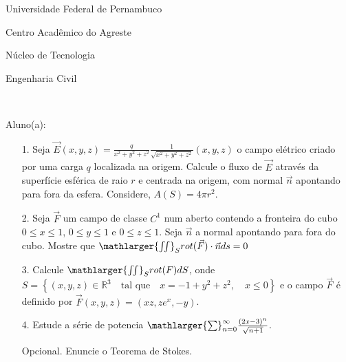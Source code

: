 \documentclass[oneside,a4paper,12pt]{article}
\newcommand{\universidade}{Universidade Federal de Pernambuco}
\newcommand{\centro}{Centro Acadêmico do Agreste}
\newcommand{\departamento}{Núcleo de Tecnologia}
\newcommand{\curso}{Engenharia Civil}
\begin{document}
	\pagestyle{empty}
	
	\begin{center}
	 	\vspace{0pt}
	 	
		\universidade
		\par
		\centro
		\par
		\departamento
		\par
		\curso
		\par
		\vspace{08pt}
		\\
	\end{center}
	
	
	\begin{flushleft}
		Aluno(a):
	\end{flushleft}
	
\begin{itemize}
\item[1.] Seja $\vec{E}(x,y,z)=\frac{q}{x^{2}+y^{2}+z^{2}}\frac{1}{\sqrt{x^{2}+y^{2}+z^{2}}}(x,y,z)$ o campo elétrico criado por uma carga $q$ localizada na origem. Calcule o fluxo de $\vec{E}$ através da superfície esférica de raio $r$ e centrada na origem, com normal $\vec{n}$ apontando para fora da esfera. Considere, $A(S)=4\pi r^{2}$.
\end{itemize}
\begin{itemize}
\item[2.] Seja $\vec{F}$ um campo de classe $C^{1}$ num aberto contendo a fronteira do cubo $0\leq x \leq 1$, $0\leq y \leq1$ e $0\leq z \leq1$. Seja $\vec{n}$ a normal apontando para fora do cubo. Mostre que $\mathlarger{\iint}_{S}rot(\vec{F})\cdot \vec{n}ds=0$ 
 \end{itemize}
 \begin{itemize}
\item [3.] Calcule $\mathlarger{\iint}_{S}rot(F)dS$, onde $S=\left\lbrace  (x,y,z)\in \mathbb{R}^{3}\quad \text{tal que}\quad x=-1+y^{2}+z^{2},\quad x\leq 0 \right\rbrace $ e o campo $\vec{F}$ é definido por $\vec{F}(x,y,z)=(xz,ze^{x},-y)$.
\end{itemize}
\begin{itemize}
\item[4.] Estude a série de potencia  $\mathlarger{\sum}_{n=0}^{\infty}\frac{(2x-3)^{n}}{\sqrt{n+1}}$.
\end{itemize}
\begin{itemize}
	\item[Opcional.] Enuncie o Teorema de Stokes.
\end{itemize}
\end{document}
